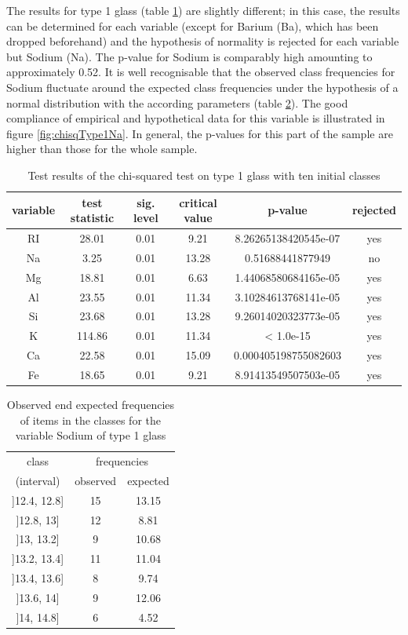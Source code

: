 \documentclass[a4paper, 12pt, titlepage, headsepline, listof = totoc, bibliography = totoc, numbers = noenddot]{scrartcl}
\begin{document}
The results for type 1 glass (table \ref{tab:chi-type1}) are slightly different; in this case, the results can be determined for each variable (except for Barium (Ba), which has been dropped beforehand) and the hypothesis of normality is rejected for each variable but Sodium (Na). The p-value for Sodium is comparably high amounting to approximately 0.52. It is well recognisable that the observed class frequencies for Sodium fluctuate around the expected class frequencies under the hypothesis of a normal distribution with the according parameters (table \ref{tab:testresChisqFreqNaType1}). The good compliance of empirical and hypothetical data for this variable is illustrated in figure \ref{fig:chisqType1Na}. In general, the p-values for this part of the sample are higher than those for the whole sample.

\begin{table}[h!]
\centering
\begin{tabular}{|cccccc|} \hline variable & test statistic & sig. level & critical value & p-value & rejected\\ \hline RI & 28.01 & 0.01 & 9.21 & 8.26265138420545e-07 & yes\\ 
Na & 3.25 & 0.01 & 13.28 & 0.51688441877949 & no\\ 
Mg & 18.81 & 0.01 & 6.63 & 1.44068580684165e-05 & yes\\ 
Al & 23.55 & 0.01 & 11.34 & 3.10284613768141e-05 & yes\\ 
Si & 23.68 & 0.01 & 13.28 & 9.26014020323773e-05 & yes\\ 
K & 114.86 & 0.01 & 11.34 & < 1.0e-15 & yes\\ 
Ca & 22.58 & 0.01 & 15.09 & 0.000405198755082603 & yes\\ 
Fe & 18.65 & 0.01 & 9.21 & 8.91413549507503e-05 & yes\\ \hline \end{tabular}\caption{Test results of the chi-squared test on type 1 glass with ten initial classes}
\label{tab:chi-type1}
\end{table}

\begin{table}[h!]
\centering
\begin{tabular}{|c|cc|} \hline class & \multicolumn{2}{c|}{frequencies}\\ (interval) & observed & expected\\ \hline ]12.4, 12.8] & 15 & 13.15\\ 
]12.8, 13] & 12 & 8.81\\ 
]13, 13.2] & 9 & 10.68\\ 
]13.2, 13.4] & 11 & 11.04\\ 
]13.4, 13.6] & 8 & 9.74\\ 
]13.6, 14] & 9 & 12.06\\ 
]14, 14.8] & 6 & 4.52\\ \hline \end{tabular}\caption{Observed end expected frequencies of items in the classes for the variable Sodium of type 1 glass}
\label{tab:testresChisqFreqNaType1}
\end{table}
\end{document}
